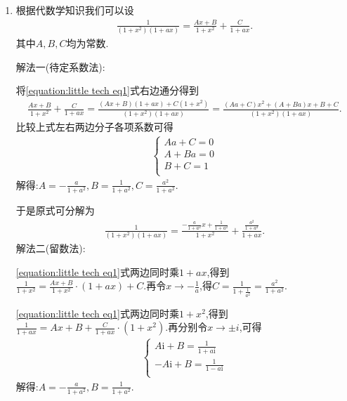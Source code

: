 \documentclass[../../main.tex]{subfiles}%
\begin{document}
\begin{solution}
\label{将多项式分式分解为其部分因式的和常用方法}
\begin{enumerate}
\item 根据代数学知识我们可以设
\begin{align}\label{equation:little tech eq1}
\frac{1}{\left( 1+x^2 \right) \left( 1+ax \right)}=\frac{Ax+B}{1+x^2}+\frac{C}{1+ax}.  
\end{align}
其中$A,B,C$均为常数.

{\color{blue}解法一(待定系数法):}

将\eqref{equation:little tech eq1}式右边通分得到
\begin{align*}
\frac{Ax+B}{1+x^2}+\frac{C}{1+ax}=\frac{\left( Ax+B \right) \left( 1+ax \right) +C\left( 1+x^2 \right)}{\left( 1+x^2 \right) \left( 1+ax \right)}=\frac{\left( Aa+C \right) x^2+\left( A+Ba \right) x+B+C}{\left( 1+x^2 \right) \left( 1+ax \right)}.
\end{align*}
比较上式左右两边分子各项系数可得
\begin{align*}
\begin{cases}
Aa+C=0\\
A+Ba=0\\
B+C=1\\
\end{cases}
\end{align*}
解得:$A=-\frac{a}{1+a^2},B=\frac{1}{1+a^2},C=\frac{a^2}{1+a^2}$.

于是原式可分解为
\begin{align*}
\frac{1}{\left( 1+x^2 \right) \left( 1+ax \right)}=\frac{-\frac{a}{1+a^2}x+\frac{1}{1+a^2}}{1+x^2}+\frac{\frac{a^2}{1+a^2}}{1+ax}.
\end{align*}
{\color{blue}解法二(留数法):}

\eqref{equation:little tech eq1}式两边同时乘$1+ax$,得到$\frac{1}{1+x^2}=\frac{Ax+B}{1+x^2}\cdot \left( 1+ax \right) +C$.再令$x\to-\frac{1}{a}$,得$C=\frac{1}{1+\frac{1}{a^2}}=\frac{a^2}{1+a^2}$.

\eqref{equation:little tech eq1}式两边同时乘$1+x^2$,得到
$\frac{1}{1+ax}=Ax+B+\frac{C}{1+ax}\cdot \left( 1+x^2 \right)$.再分别令$x\to \pm i$,可得
\begin{align*}
\begin{cases}
A\mathrm{i}+B=\frac{1}{1+a\mathrm{i}}\\
-A\mathrm{i}+B=\frac{1}{1-a\mathrm{i}}\\
\end{cases}
\end{align*}
解得:$A=-\frac{a}{1+a^2},B=\frac{1}{1+a^2}$.


\end{enumerate}
\end{solution}
\end{document}
